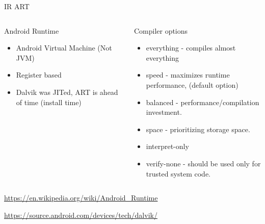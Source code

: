 %
\begin{Frame}{IR ART}
  \begin{columns}[t]
    \begin{column}{5cm} %
      \begin{block}{Android Runtime}
        \begin{itemize}
        \item Android Virtual Machine (Not JVM)
        \item Register based
        \item Dalvik was JITed, ART is ahead of time (install time)
        \end{itemize}
      \end{block} 
    \end{column}
    
    \begin{column}{5cm} %
      \begin{block}{Compiler options}
        \begin{itemize}
        \item everything - compiles almost everything
        \item speed - maximizes runtime performance, (default option)
        \item balanced -  performance/compilation investment.
        \item space - prioritizing storage space.
        \item interpret-only
        \item verify-none - should be used only for trusted system code. 

        \end{itemize}
      \end{block}   
    \end{column}
  \end{columns}  
\url{https://en.wikipedia.org/wiki/Android_Runtime}

\url{https://source.android.com/devices/tech/dalvik/}
\end{Frame}


